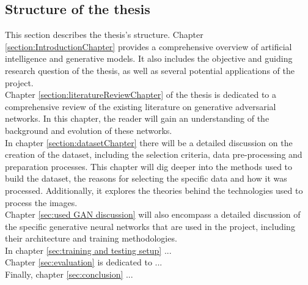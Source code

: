 \subsection{Structure of the thesis}
This section describes the thesis's structure. Chapter \ref{section:IntroductionChapter} provides a comprehensive overview of artificial intelligence and generative models. It also includes the objective and guiding research question of the thesis, as well as several potential applications of the project.\\
Chapter \ref{section:literatureReviewChapter} of the thesis is dedicated to a comprehensive review of the existing literature on generative adversarial networks. In this chapter, the reader will gain an understanding of the background and evolution of these networks.\\
In chapter \ref{section:datasetChapter} there will be a detailed discussion on the creation of the dataset, including the selection criteria, data pre-processing and preparation processes. This chapter will dig deeper into the methods used to build the dataset, the reasons for selecting the specific data and how it was processed. Additionally, it explores the theories behind the technologies used to process the images.\\
Chapter \ref{sec:used GAN discussion} will also encompass a detailed discussion of the specific generative neural networks that are used in the project, including their architecture and training methodologies.\\
In chapter \ref{sec:training and testing setup} ...\\
Chapter \ref{sec:evaluation} is dedicated to ...\\
Finally, chapter \ref{sec:conclusion} ...\\
